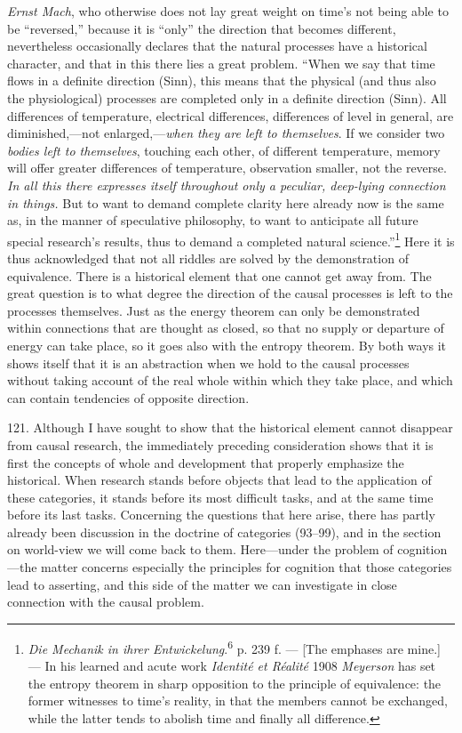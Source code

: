 \documentclass[12pt,a4paper]{book}
\newcommand{\opage}[1]{\marginnote{\footnotesize\textit{[#1]}}}
\begin{document}
\emph{Ernst Mach}, who otherwise does not lay great weight on time's not being
able to be ``reversed,'' because it is ``only'' the direction that becomes
different, nevertheless occasionally declares that the natural processes have a
historical character, and that in this there lies a great problem. ``When we say
that time flows in a definite direction (Sinn), this means that the physical
(and thus also the physiological) processes are completed only in a definite
direction (Sinn). All differences of temperature, electrical differences,
differences of level in general, are diminished,---not enlarged,---\emph{when
they are left to themselves}. If we consider two \emph{bodies left to
themselves}, touching each other, of different temperature, memory will offer
greater differences of temperature, observation smaller, not the reverse.
\emph{In all this there expresses itself throughout only a peculiar, \opage{287}deep-lying
connection in things.} But to want to demand complete clarity here already now is
the same as, in the manner of speculative philosophy, to want to anticipate all
future special research's results, thus to demand a completed natural
science.''\footnote{\emph{Die Mechanik in ihrer Entwickelung}.\textsuperscript{6}
p. 239 f. --- [The emphases are mine.] --- In his learned and acute work
\emph{Identité et Réalité} 1908 \emph{Meyerson} has set the entropy theorem in
sharp opposition to the principle of equivalence: the former witnesses to time's
reality, in that the members cannot be exchanged, while the latter tends to
abolish time and finally all difference.} Here it is thus acknowledged that not
all riddles are solved by the demonstration of equivalence. There is a
historical element that one cannot get away from. The great question is to what
degree the direction of the causal processes is left to the processes themselves. Just as the energy theorem can only be demonstrated within connections that are thought as
closed, so that no supply or departure of energy can take place, so it goes also
with the entropy theorem. By both ways it shows itself that it is an abstraction
when we hold to the causal processes without taking account of the real whole
within which they take place, and which can contain tendencies of opposite
direction.

121. Although I have sought to show that the historical element cannot disappear
from causal research, the immediately preceding consideration shows that it is
first the concepts of whole and development that properly emphasize the
historical. When research stands before objects that lead to the application of
these categories, it stands before its most difficult tasks, and at the same time
before its last tasks. Concerning the questions that here arise, there has partly
already been discussion in the doctrine of categories (93--99), and in the section
on world-view we will come back to them. Here---under the problem of
cognition---the matter concerns especially the principles for cognition that those
categories lead to asserting, and this side of the matter we can investigate in
close connection with the causal problem.
\end{document}
